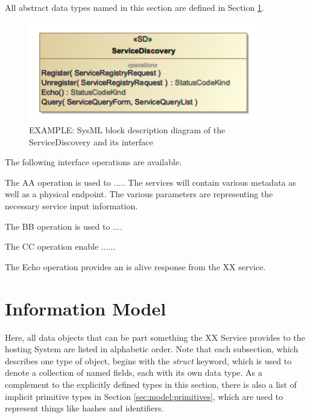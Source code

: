 \documentclass[a4paper]{arrowhead}
\begin{document}
All abstract data types named in this section are defined in Section \ref{sec:model}.
\color{black}

\begin{figure}[h!]
  \centering
  \includegraphics[width=10cm]{figures/ServiceDiscovery_SD}
  \caption{\color{red} EXAMPLE: SysML block description diagram of the ServiceDiscovery and
    its interface \color{black}}
  \label{fig:SD}
\end{figure}

The following interface operations are available.


\color{red} 
The AA operation is used to ..... The services will contain various
metadata as well as a physical endpoint. The various parameters are
representing the necessary service input information.
\color{black}


\color{red} 
The BB operation is used to .... 
\color{black}


\color{red} 
The CC operation enable ......
\color{black}


\color{red} 
The Echo operation provides an is alive response from the XX service.
\color{black}

\newpage

\section{Information Model}
\label{sec:model}

\color{red} 
Here, all data objects that can be part something the XX Service
provides to the hosting System are listed in alphabetic order.
Note that each subsection, which describes one type of object, begins with the \textit{struct} keyword, which is used to denote a collection of named fields, each with its own data type.
As a complement to the explicitly defined types in this section, there is also a list of implicit primitive types in Section \ref{sec:model:primitives}, which are used to represent things like hashes and identifiers.
\color{black}
\end{document}
